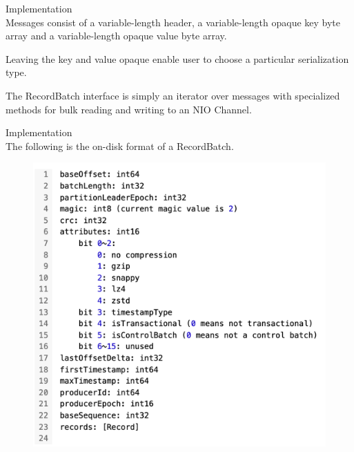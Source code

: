 \begin{frame}[plain,t]{Implementation} %
     \\
    \vspace{2ex}
    Messages consist of a variable-length header, a variable-length opaque key byte array and a variable-length opaque value byte array.
    
    \vspace{2ex}
    Leaving the key and value opaque enable user to choose a particular serialization type.
    
    \vspace{2ex}
    The RecordBatch interface is simply an iterator over messages with specialized methods for bulk reading and writing to an NIO Channel.
    
    
    
\end{frame}
\begin{frame}[plain,t]{Implementation} %
     \\
    \vspace{1ex}
    The following is the on-disk format of a RecordBatch.
    \vspace{-1ex}
    \begin{figure}
        \centering
        \includegraphics[width=0.7\linewidth]{image/0302}
        \label{fig:0302}
    \end{figure}
    
    
\end{frame}
